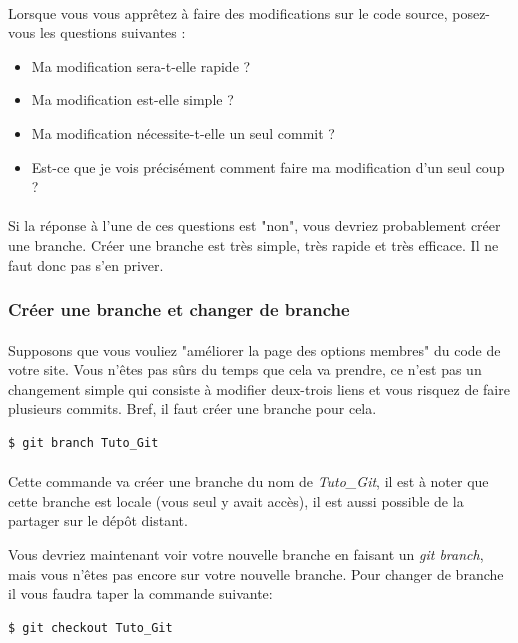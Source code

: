 \documentclass[french, a4paper, 12pt, titlepage]{article}
\begin{document}
\paragraph{}Lorsque vous vous apprêtez à faire des modifications sur le code source, posez-vous les questions suivantes :
\begin{itemize}
\item Ma modification sera-t-elle rapide ?
\item Ma modification est-elle simple ?
\item Ma modification nécessite-t-elle un seul commit ?
\item Est-ce que je vois précisément comment faire ma modification d’un seul coup ?
\end{itemize}

\paragraph{}Si la réponse à l’une de ces questions est "non", vous devriez probablement créer une branche. Créer une branche est très simple, très rapide et très efficace. Il ne faut donc pas s’en priver.

\subsubsection{Créer une branche et changer de branche}
\paragraph{}Supposons que vous vouliez "améliorer la page des options membres" du code de votre site. Vous n’êtes pas sûrs du temps que cela va prendre, ce n’est pas un changement simple qui consiste à modifier deux-trois liens et vous risquez de faire plusieurs commits. Bref, il faut créer une branche pour cela.
\begin{lstlisting}
$ git branch Tuto_Git
\end{lstlisting}

\paragraph{}Cette commande va créer une branche du nom de \emph{Tuto\_Git}, il est à noter que cette branche est locale (vous seul y avait accès), il est aussi possible de la partager sur le dépôt distant.

Vous devriez maintenant voir votre nouvelle branche en faisant un \emph{git branch}, mais vous n'êtes pas encore sur votre nouvelle branche. Pour changer de branche il vous faudra taper la commande suivante:
\begin{lstlisting}
$ git checkout Tuto_Git
\end{lstlisting}
\end{document}

